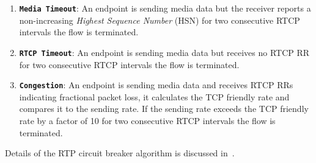 \begin{enumerate}
\setlength{\itemsep}{0pt}

\item \textbf{\texttt{Media Timeout}}: An endpoint is sending media data but
the receiver reports a non-increasing \emph{Highest Sequence Number} (HSN) for
two consecutive RTCP intervals the flow is terminated.

\item \textbf{\texttt{RTCP Timeout}}: An endpoint is sending media data but
receives no RTCP RR for two consecutive RTCP intervals the flow is terminated.

\item \textbf{\texttt{Congestion}}: An endpoint is sending media data and
receives RTCP RRs indicating fractional packet loss, it calculates the TCP
friendly rate and compares it to the sending rate. If the sending rate exceeds
the TCP friendly rate  by a factor of 10 for two consecutive RTCP intervals
the flow is terminated.

\end{enumerate}

Details of the RTP circuit breaker algorithm is discussed
in~\cite{draft.rtp.cb}.
